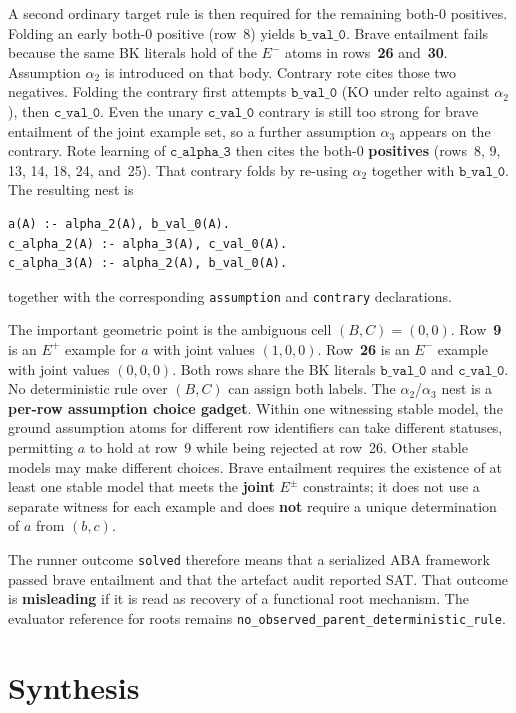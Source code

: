 \documentclass[11pt]{article}
\begin{document}
A second ordinary target rule is then required for the remaining both-0
positives.
Folding an early both-0 positive (row~8) yields \(\mathtt{b\_val\_0}\).
Brave entailment fails because the same BK literals hold of the \(E^-\) atoms
in rows~\textbf{26} and~\textbf{30}.
Assumption \(\alpha_2\) is introduced on that body.
Contrary rote cites those two negatives.
Folding the contrary first attempts \(\mathtt{b\_val\_0}\) (KO under relto
against \(\alpha_2\)), then \(\mathtt{c\_val\_0}\).
Even the unary \(\mathtt{c\_val\_0}\) contrary is still too strong for brave
entailment of the joint example set, so a further assumption \(\alpha_3\)
appears on the contrary.
Rote learning of \(\mathtt{c\_alpha\_3}\) then cites the both-0
\textbf{positives} (rows~8, 9, 13, 14, 18, 24, and~25).
That contrary folds by re-using \(\alpha_2\) together with
\(\mathtt{b\_val\_0}\).
The resulting nest is
\begin{verbatim}
a(A) :- alpha_2(A), b_val_0(A).
c_alpha_2(A) :- alpha_3(A), c_val_0(A).
c_alpha_3(A) :- alpha_2(A), b_val_0(A).
\end{verbatim}
together with the corresponding \texttt{assumption} and \texttt{contrary}
declarations.

The important geometric point is the ambiguous cell \((B,C)=(0,0)\).
Row~\textbf{9} is an \(E^+\) example for \(a\) with joint values \((1,0,0)\).
Row~\textbf{26} is an \(E^-\) example with joint values \((0,0,0)\).
Both rows share the BK literals \(\mathtt{b\_val\_0}\) and
\(\mathtt{c\_val\_0}\).
No deterministic rule over \((B,C)\) can assign both labels.
The \(\alpha_2\)/\(\alpha_3\) nest is a \textbf{per-row assumption choice
gadget}.
Within one witnessing stable model, the ground assumption atoms for different
row identifiers can take different statuses, permitting \(a\) to hold at row~9
while being rejected at row~26.
Other stable models may make different choices.
Brave entailment requires the existence of at least one stable model that meets
the \textbf{joint} \(E^\pm\) constraints; it does not use a separate witness for
each example and does \textbf{not} require a unique determination of \(a\) from
\((b,c)\).

The runner outcome \texttt{solved} therefore means that a serialized ABA
framework passed brave entailment and that the artefact audit reported SAT.
That outcome is \textbf{misleading} if it is read as recovery of a functional
root mechanism.
The evaluator reference for roots remains
\texttt{no\_observed\_parent\_deterministic\_rule}.

\section{Synthesis}
\end{document}
